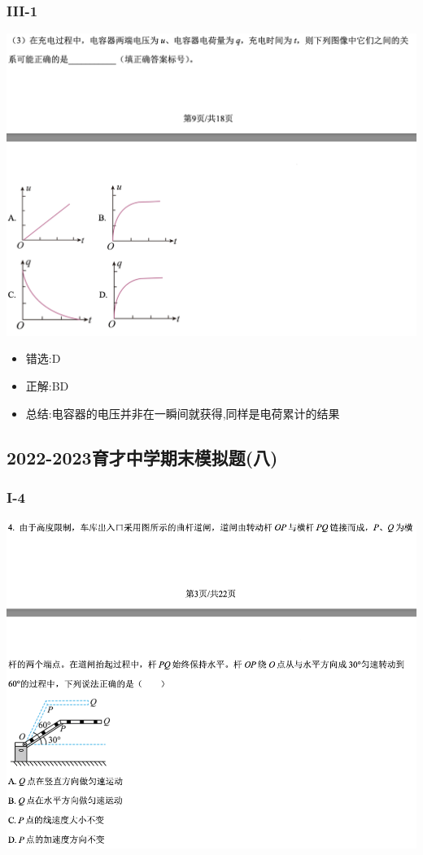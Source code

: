 \documentclass{article}
\begin{document}
    \subsubsection{III-1}
    \includegraphics[width=50em,keepaspectratio]{./pictures/1.1-4.png}

    \begin{itemize}
        \item 错选:\quad D
        \item 正解:\quad BD
        \item 总结:\quad 电容器的电压并非在一瞬间就获得,同样是电荷累计的结果
    \end{itemize}


    \subsection{2022-2023育才中学期末模拟题(八)}

    \subsubsection{I-4}
    \includegraphics[width=50em,keepaspectratio]{./pictures/1.2-1.png}
\end{document}
